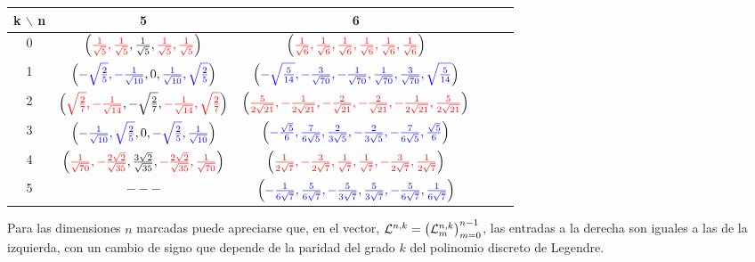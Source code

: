 \begin{center}
\begin{tabular}{ c c c c c c }
k $\backslash$ n & 5 & 6  \\ 
\hline
0 & 
$\left(
{\color{red}{\frac{1}{\sqrt{5}}, \frac{1}{\sqrt{5}}}}, \frac{1}{\sqrt{5}},
{\color{red}{\frac{1}{\sqrt{5}}, \frac{1}{\sqrt{5}}}} 
\right)$ 
& $\left(
{\color{red}{\frac{1}{\sqrt{6}}, \frac{1}{\sqrt{6}}, \frac{1}{\sqrt{6}},
\frac{1}{\sqrt{6}}, \frac{1}{\sqrt{6}}, \frac{1}{\sqrt{6}}}} 
\right)$ \\ 
1 &  
$\left(
{\color{blue}{-\sqrt{\frac{2}{5}}, -\frac{1}{\sqrt{10}}}}, 0,
{\color{blue}{\frac{1}{\sqrt{10}}, \sqrt{\frac{2}{5}}}} 
\right)$  & 
$\left(
{\color{blue}{-\sqrt{\frac{5}{14}}, -\frac{3}{\sqrt{70}}, -\frac{1}{\sqrt{70}},
\frac{1}{\sqrt{70}}, \frac{3}{\sqrt{70}}, \sqrt{\frac{5}{14}} }}
\right)$ \\ 
2 & 
$\left(
{\color{red}{\sqrt{\frac{2}{7}}, -\frac{1}{\sqrt{14}}}}, -\sqrt{\frac{2}{7}},
{\color{red}{-\frac{1}{\sqrt{14}}, \sqrt{\frac{2}{7}}}} \right)$ 
& $\left(
{\color{red}{\frac{5}{2\sqrt{21}}, -\frac{1}{2\sqrt{21}}, -\frac{2}{\sqrt{21}},
-\frac{2}{\sqrt{21}}, -\frac{1}{2\sqrt{21}}, \frac{5}{2\sqrt{21}}}} 
\right)$ \\ 
3 & 
$\left(
{\color{blue}{-\frac{1}{\sqrt{10}}, \sqrt{\frac{2}{5}}}}, 0,
{\color{blue}{-\sqrt{\frac{2}{5}}, \frac{1}{\sqrt{10}}}} 
\right)$ &
$\left(
{\color{blue}{-\frac{\sqrt{5}}{6}, \frac{7}{6\sqrt{5}}, \frac{2}{3\sqrt{5}},
-\frac{2}{3\sqrt{5}}, -\frac{7}{6\sqrt{5}}, \frac{\sqrt{5}}{6}}}
\right)$ \\ 
4 & $\left(
{\color{red}{\frac{1}{\sqrt{70}}, -\frac{2\sqrt{2}}{\sqrt{35}}}}, 
\frac{3\sqrt{2}}{\sqrt{35}},
{\color{red}{-\frac{2\sqrt{2}}{\sqrt{35}}, \frac{1}{\sqrt{70}}}} 
\right) $ & 
$\left( 
{\color{red}{\frac{1}{2\sqrt{7}}, -\frac{3}{2\sqrt{7}}, \frac{1}{\sqrt{7}},
\frac{1}{\sqrt{7}}, -\frac{3}{2\sqrt{7}}, \frac{1}{2\sqrt{7}}}} 
\right)$ \\ 
5 & $---$ & 
$\left(
{\color{blue}{-\frac{1}{6\sqrt{7}}, \frac{5}{6\sqrt{7}}, -\frac{5}{3\sqrt{7}},
\frac{5}{3\sqrt{7}}, -\frac{5}{6\sqrt{7}}, \frac{1}{6\sqrt{7}}}} 
\right)$ 
\end{tabular}
\end{center}


		
Para las dimensiones $n$ marcadas
puede apreciarse que, en el vector,
$\mathcal{L}^{n,k} = \left( \mathcal{L}^{n,k}_{m} \right)_{m=0}^{n-1}$,
las entradas a la derecha son iguales a las de la izquierda,
con un cambio de signo que depende de la paridad del
grado $k$ del polinomio discreto de Legendre. \\

